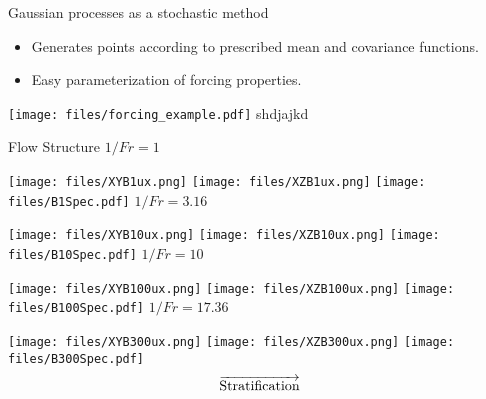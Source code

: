 \documentclass{beamer}
\begin{document}
\begin{frame}{Gaussian processes as a stochastic method}
    \begin{itemize}
        \item Generates points according to prescribed mean and covariance functions.
        \item Easy parameterization of forcing properties.
    \end{itemize}

        \centering
        \emp
        \texttt{[image: files/forcing\_example.pdf]}
        \emp
        {\color{white} shdjajkd}
        \emp
    \emp
    
\end{frame}



\begin{frame}{Flow Structure}
    \centering
        \centering
        $1/Fr = 1$
        \vspace{2pt}
        
        \texttt{[image: files/XYB1ux.png]}
        \texttt{[image: files/XZB1ux.png]}
        \texttt{[image: files/B1Spec.pdf]}
    \emp
    \hspace{1pt}
        \centering
        $1/Fr = 3.16$
        \vspace{2pt}
        
        \texttt{[image: files/XYB10ux.png]}
        \texttt{[image: files/XZB10ux.png]}
        \texttt{[image: files/B10Spec.pdf]}
    \emp
    \hspace{1pt}
        \centering
        $1/Fr = 10$
        \vspace{2pt}
        
        \texttt{[image: files/XYB100ux.png]}
        \texttt{[image: files/XZB100ux.png]}
        \texttt{[image: files/B100Spec.pdf]}
    \emp
    \hspace{1pt}
        \centering
        $1/Fr = 17.36$
        \vspace{2pt}
        
        \texttt{[image: files/XYB300ux.png]}
        \texttt{[image: files/XZB300ux.png]}
        \texttt{[image: files/B300Spec.pdf]}
    \emp
    \[\overrightarrow{\rm Stratification}\]
\end{frame}
\end{document}
